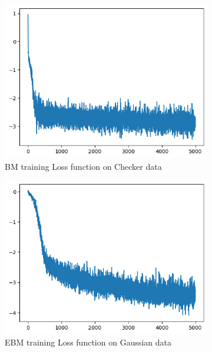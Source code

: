 \documentclass[11pt]{article}
\begin{document}
		\begin{figure}[H]
		\centering 
		\begin{subfigure}{0.45\textwidth}
			\centering
			\includegraphics[width=\textwidth]{EBM_Loss.png}
			\caption{BM training Loss function on Checker data}
			\label{fig:BMChckerLoss}
		\end{subfigure}
		\hfill
		\begin{subfigure}{0.45\textwidth}
			\centering
			\includegraphics[width=\textwidth]{EBM_Gaussian_Loss.png}
			\caption{EBM training Loss function on Gaussian data}
			\label{fig:EBMGaussianLoss}
		\end{subfigure}
		\\
		\begin{subfigure}{0.45\textwidth}

\end{subfigure}
\end{figure}
\end{document}
